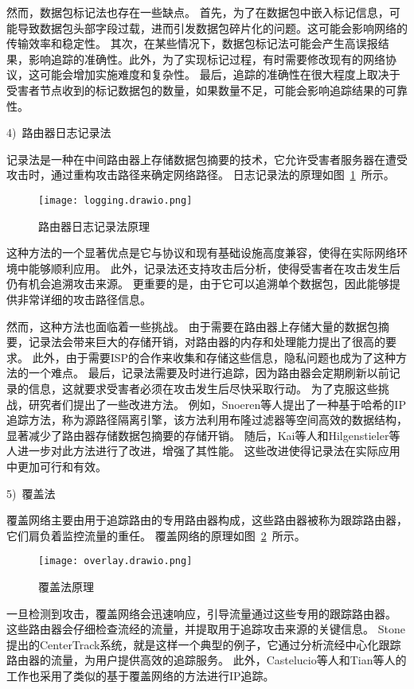 然而，数据包标记法也存在一些缺点。
首先，为了在数据包中嵌入标记信息，可能导致数据包头部字段过载，进而引发数据包碎片化的问题。这可能会影响网络的传输效率和稳定性。
其次，在某些情况下，数据包标记法可能会产生高误报结果，影响追踪的准确性。此外，为了实现标记过程，有时需要修改现有的网络协议，这可能会增加实施难度和复杂性。
最后，追踪的准确性在很大程度上取决于受害者节点收到的标记数据包的数量，如果数量不足，可能会影响追踪结果的可靠性。


4)~路由器日志记录法\par
记录法是一种在中间路由器上存储数据包摘要的技术，它允许受害者服务器在遭受攻击时，通过重构攻击路径来确定网络路径。
日志记录法的原理如图~\ref{fig:loggging}~所示。
\begin{figure}[htbp]
  \centering
  \texttt{[image: logging.drawio.png]}
  \caption{路由器日志记录法原理}
  \label{fig:loggging}
\end{figure}
这种方法的一个显著优点是它与协议和现有基础设施高度兼容，使得在实际网络环境中能够顺利应用。
此外，记录法还支持攻击后分析，使得受害者在攻击发生后仍有机会追溯攻击来源。
更重要的是，由于它可以追溯单个数据包，因此能够提供非常详细的攻击路径信息。\par

然而，这种方法也面临着一些挑战。
由于需要在路由器上存储大量的数据包摘要，记录法会带来巨大的存储开销，对路由器的内存和处理能力提出了很高的要求。
此外，由于需要ISP的合作来收集和存储这些信息，隐私问题也成为了这种方法的一个难点。
最后，记录法需要及时进行追踪，因为路由器会定期刷新以前记录的信息，这就要求受害者必须在攻击发生后尽快采取行动。
为了克服这些挑战，研究者们提出了一些改进方法。
例如，Snoeren等人\cite{Snoeren2001}提出了一种基于哈希的IP追踪方法，称为源路径隔离引擎，该方法利用布隆过滤器等空间高效的数据结构，显著减少了路由器存储数据包摘要的存储开销。
随后，Kai等人\cite{Kai2009}和Hilgenstieler等人\cite{Hilgenstieler2010}进一步对此方法进行了改进，增强了其性能。
这些改进使得记录法在实际应用中更加可行和有效。\par

5)~覆盖法\par
覆盖网络主要由用于追踪路由的专用路由器构成，这些路由器被称为跟踪路由器，它们肩负着监控流量的重任。
覆盖网络的原理如图~\ref{fig:overlay}~所示。
\begin{figure}[htbp]
  \centering
  \texttt{[image: overlay.drawio.png]}
  \caption{覆盖法原理}
  \label{fig:overlay}
\end{figure}
一旦检测到攻击，覆盖网络会迅速响应，引导流量通过这些专用的跟踪路由器。
这些路由器会仔细检查流经的流量，并提取用于追踪攻击来源的关键信息。
Stone提出的CenterTrack系统，就是这样一个典型的例子，它通过分析流经中心化跟踪路由器的流量，为用户提供高效的追踪服务\cite{stone2000centertrack}。
此外，Castelucio等人\cite{castelucio2009aslevel}和Tian等人\cite{tian2011easytrace}的工作也采用了类似的基于覆盖网络的方法进行IP追踪。\par

